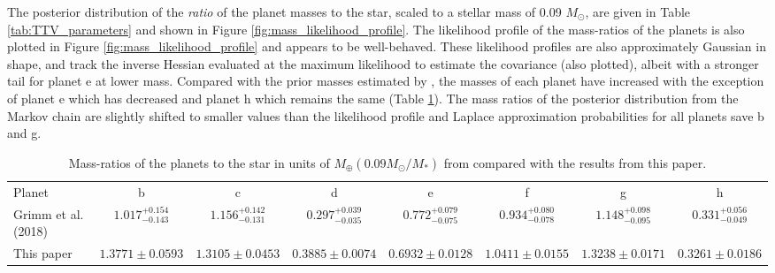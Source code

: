 \documentclass[fleqn,usenatbib]{mnras} %
\begin{document}
The posterior distribution of the {\it ratio} of the planet masses to the star, scaled to a stellar mass of 0.09 $M_\odot$, are given in Table \ref{tab:TTV_parameters} and shown in Figure \ref{fig:mass_likelihood_profile}.  The likelihood profile of
the mass-ratios of the planets is also plotted in 
Figure \ref{fig:mass_likelihood_profile} and appears to be well-behaved. These
likelihood profiles are also approximately Gaussian in shape, and track the inverse Hessian evaluated at the maximum likelihood to estimate the covariance (also plotted), albeit with a stronger
tail for planet e at lower mass.  Compared with the prior masses
estimated by \citet{Grimm2018}, the masses of each planet have increased
with the exception of planet e which has decreased and planet h which remains the same (Table \ref{tab:grimm_vs_agol}).   The mass ratios of the posterior distribution from the Markov chain  are slightly shifted to smaller values than the likelihood profile and Laplace approximation probabilities for all planets save b and g. 

\begin{table}
    \centering
    \caption{Mass-ratios of the planets to the star in units of
    $M_\oplus (0.09 M_\odot/M_*)$ from \citet{Grimm2018} compared with the results from this paper.}
    \begin{tabular}{l|c|c|c|c|c|c|c}
       Planet  & b & c & d & e & f & g & h  \\
       Grimm et al. (2018) & $1.017_{-0.143}^{+ 0.154}$ & $1.156_{- 0.131 }^{+0.142}$ & $0.297_{- 0.035}^{+ 0.039}$ & $0.772_{- 0.075}^{+ 0.079}$ & $0.934_{- 0.078 }^{+0.080}$ & $1.148_{- 0.095}^{+ 0.098}$ & $0.331_{- 0.049}^{+ 0.056}$\\
       This paper & $1.3771{\pm} 0.0593$ & $1.3105{\pm}0.0453$ & $0.3885{\pm}0.0074$ & $0.6932{\pm}0.0128$ & $1.0411{\pm}0.0155$ & $1.3238{\pm}0.0171$ & $0.3261{\pm}0.0186$ \\
    \end{tabular}
    
    \label{tab:grimm_vs_agol}
\end{table}
\end{document}
